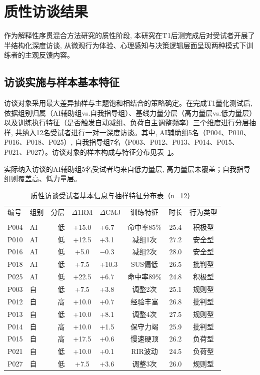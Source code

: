\section{质性访谈结果}
\label{sec:qualitative}

作为解释性序贯混合方法研究的质性阶段, 本研究在T1后测完成后对受试者开展了半结构化深度访谈, 从微观行为体验、心理感知与决策逻辑层面呈现两种模式下训练者的主观反馈内容。

\subsection{访谈实施与样本基本特征}
\label{sec:interview_sample}

访谈对象采用最大差异抽样与主题饱和相结合的策略确定。在完成T1量化测试后, 依据组别归属（AI辅助组vs.自我指导组）、基线力量分层（高力量层vs.低力量层）以及训练执行特征（是否触发自动减组、负荷自主调整频率）三个维度进行分层抽样, 共纳入12名受试者进行一对一深度访谈。其中, AI辅助组5名（P004、P010、P016、P018、P025）, 自我指导组7名（P003、P012、P013、P014、P015、P021、P027）。访谈对象的样本构成与特征分布见表~\ref{tab:interview_sample}。

实际纳入访谈的AI辅助组5名受试者均来自低力量层, 高力量层未覆盖；自我指导组则覆盖高、低力量层。

\begin{table}[htbp]
\centering
\caption{质性访谈受试者基本信息与抽样特征分布表（n=12）}
\label{tab:interview_sample}

\small
\begin{tabular}{llrcp{2cm}ccc}
\toprule
编号 & 组别 & 分层 & $\Delta$1RM & $\Delta$CMJ & 训练特征 & 时长 & 行为类型 \\
 \\
\midrule
P004 & AI & 低 & +15.0 & +6.7 & 命中率85\% & 25.4 & 积极型 \\
P010 & AI & 低 & +12.5 & +3.1 & 减组1次 & 27.2 & 安全型 \\
P016 & AI & 低 & +5.0 & $-$0.3 & 减组2次 & 28.0 & 安全型 \\
P018 & AI & 低 & +7.5 & +10.3 & SUS偏低 & 26.5 & 批判型 \\
P025 & AI & 低 & +22.5 & +6.7 & 命中率89\% & 24.8 & 积极型 \\
P003 & 自 & 低 & +7.5 & +3.8 & 调整2次 & 25.1 & 规则型 \\
P012 & 自 & 高 & +10.0 & +0.7 & 经验丰富 & 26.8 & 批判型 \\
P013 & 自 & 低 & +10.0 & +8.1 & 调整4次 & 27.5 & 规则型 \\
P014 & 自 & 高 & +10.0 & +1.5 & 保守力竭 & 25.9 & 批判型 \\
P015 & 自 & 高 & +17.5 & +0.6 & 慢速硬顶 & 26.2 & 负荷型 \\
P021 & 自 & 低 & +10.0 & +0.1 & RIR波动 & 24.5 & 负荷型 \\
P027 & 自 & 低 & +7.5 & +3.6 & 调整3次 & 26.0 & 规则型 \\
\bottomrule
\end{tabular}

\end{table}

